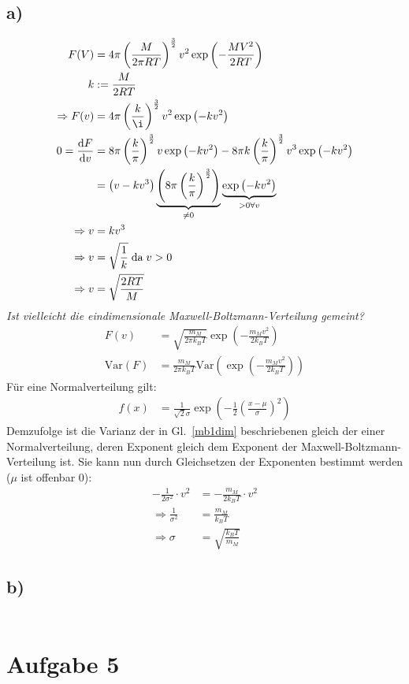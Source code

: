 \documentclass[12pt,a4paper,notitlepage]{article}
\newcommand{\diff}{\mathrm{d}}
\newcommand{\aufgabe}[1]{\section*{\setcounter{section}{#1}Aufgabe #1}}
\begin{document}
\subsection*{a)}
\begin{align}
F(V)&=4\pi\left(\frac{M}{2\pi RT}\right)^{\frac{3}{2}}v^2\exp\left(-\frac{MV^2}{2RT}\right)\\
k&:=\frac{M}{2RT}\\
\Rightarrow F(v)&=4\pi\left(\frac{k}{\i}\right)^\frac{3}{2}v^2\exp\left(-kv^2\right)\\
0=\frac{\diff F}{\diff v}&=8\pi\left(\frac{k}{\pi}\right)^\frac{3}{2}v\exp\left(-kv^2\right)-8\pi k\left(\frac{k}{\pi}\right)^\frac{3}{2}v^3\exp\left(-kv^2\right)\\
&=\left(v-kv^3\right)\underbrace{\left(8\pi\left(\frac{k}{\pi}\right)^\frac{3}{2}\right)}_{\neq 0}\underbrace{\exp\left(-kv^2\right)}_{>0\forall v}\\
\Rightarrow v&=kv^3\\
\Rightarrow v&=\sqrt{\frac{1}{k}}\;\text{da}\;v>0\\
\Rightarrow v&=\sqrt{\frac{2RT}{M}}
\end{align}
\emph{Ist vielleicht die eindimensionale Maxwell-Boltzmann-Verteilung gemeint?}
\begin{align}
F(v)&=\sqrt{\frac{m_M}{2\pi k_BT}}\exp\left(-\frac{m_Mv^2}{2k_BT}\right)\label{mb1dim}\\
\mathrm{Var}(F)&=\frac{m_M}{2\pi k_BT}\mathrm{Var}\left(\exp\left(-\frac{m_Mv^2}{2k_BT}\right)\right)
\end{align}
Für eine Normalverteilung gilt:
\begin{align}
f(x)&=\frac{1}{\sqrt{2}\sigma}\exp\left(-\frac{1}{2}\left(\frac{x-\mu}{\sigma}\right)^2\right)
\end{align}
Demzufolge ist die Varianz der in Gl.\ \ref{mb1dim} beschriebenen gleich der einer Normalverteilung, deren Exponent gleich dem Exponent der Maxwell-Boltzmann-Verteilung ist. Sie kann nun durch Gleichsetzen der Exponenten bestimmt werden ($\mu$ ist offenbar 0):
\begin{align}
-\frac{1}{2\sigma^2}\cdot v^2&=-\frac{m_M}{2k_BT}\cdot v^2\\
\Rightarrow \frac{1}{\sigma^2}&=\frac{m_M}{k_BT}\\
\Rightarrow \sigma&=\sqrt{\frac{k_BT}{m_M}}
\end{align}
\subsection*{b)}
\begin{align}
\end{align}
\aufgabe{5}
\end{document}
